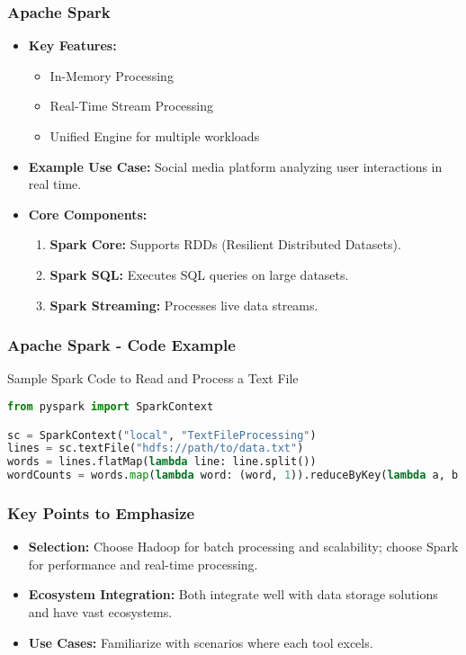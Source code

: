 \documentclass[aspectratio=169]{beamer}
\begin{document}
\begin{frame}[fragile]
  \frametitle{Apache Spark}
  \begin{itemize}
    \item \textbf{Key Features:}
      \begin{itemize}
        \item In-Memory Processing
        \item Real-Time Stream Processing
        \item Unified Engine for multiple workloads
      \end{itemize}

    \item \textbf{Example Use Case:} 
      Social media platform analyzing user interactions in real time.
      
    \item \textbf{Core Components:}
      \begin{enumerate}
        \item \textbf{Spark Core:} Supports RDDs (Resilient Distributed Datasets).
        \item \textbf{Spark SQL:} Executes SQL queries on large datasets.
        \item \textbf{Spark Streaming:} Processes live data streams.
      \end{enumerate}
  \end{itemize}
\end{frame}

\begin{frame}[fragile]
  \frametitle{Apache Spark - Code Example}
  \begin{block}{Sample Spark Code to Read and Process a Text File}
  \begin{lstlisting}[language=Python]
from pyspark import SparkContext

sc = SparkContext("local", "TextFileProcessing")
lines = sc.textFile("hdfs://path/to/data.txt")
words = lines.flatMap(lambda line: line.split())
wordCounts = words.map(lambda word: (word, 1)).reduceByKey(lambda a, b: a + b)
  \end{lstlisting}
  \end{block}
\end{frame}

\begin{frame}
  \frametitle{Key Points to Emphasize}
  \begin{itemize}
    \item \textbf{Selection:} 
      Choose Hadoop for batch processing and scalability; choose Spark for performance and real-time processing.
    \item \textbf{Ecosystem Integration:} 
      Both integrate well with data storage solutions and have vast ecosystems.
    \item \textbf{Use Cases:} 
      Familiarize with scenarios where each tool excels.
  \end{itemize}
\end{frame}
\end{document}
